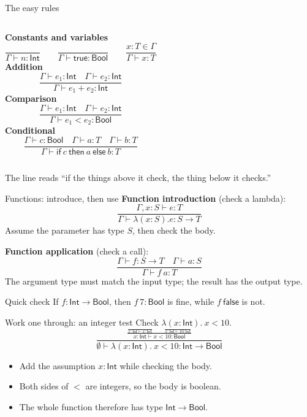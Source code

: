 \documentclass[aspectratio=169,11pt]{beamer}
\newcommand{\Bool}{\mathsf{Bool}}
\newcommand{\Int}{\mathsf{Int}}
\newcommand{\Arrow}{\mathbin{\to}}
\begin{document}
\begin{frame}{The easy rules}
\small
\begin{columns}[T]
\textbf{Constants and variables}
\[
\frac{}{\Gamma\vdash n:\Int}\qquad
\frac{}{\Gamma\vdash \mathsf{true}:\Bool}\qquad
\frac{x:T\in\Gamma}{\Gamma\vdash x:T}
\]
\textbf{Addition}
\[
\frac{\Gamma\vdash e_1:\Int\quad \Gamma\vdash e_2:\Int}
     {\Gamma\vdash e_1+e_2:\Int}
\]
\textbf{Comparison}
\[
\frac{\Gamma\vdash e_1:\Int\quad \Gamma\vdash e_2:\Int}
     {\Gamma\vdash e_1<e_2:\Bool}
\]
\textbf{Conditional}
\[
\frac{\Gamma\vdash c:\Bool\quad \Gamma\vdash a:T\quad \Gamma\vdash b:T}
     {\Gamma\vdash \mathsf{if}\ c\ \mathsf{then}\ a\ \mathsf{else}\ b:T}
\]
\end{columns}
\medskip
The line reads “if the things above it check, the thing below it checks.”
\end{frame}

\begin{frame}{Functions: introduce, then use}
\small
\textbf{Function introduction} (check a lambda):
\[
\frac{\Gamma,x:S\vdash e:T}
     {\Gamma\vdash \lambda(x:S).e:S\Arrow T}
\]
Assume the parameter has type $S$, then check the body.
\medskip

\textbf{Function application} (check a call):
\[
\frac{\Gamma\vdash f:S\Arrow T\quad \Gamma\vdash a:S}
     {\Gamma\vdash f\ a:T}
\]
The argument type must match the input type; the result has the output type.
\begin{exampleblock}{Quick check}
If $f:\Int\Arrow\Bool$, then $f\ 7:\Bool$ is fine, while $f\ \mathsf{false}$ is not.
\end{exampleblock}
\end{frame}

\begin{frame}{Work one through: an integer test}
Check $\lambda(x:\Int).\ x<10$.
\[
\frac{\displaystyle
  \frac{\displaystyle
    \frac{}{x:\Int\vdash x:\Int}\qquad
    \frac{}{x:\Int\vdash 10:\Int}}
  {x:\Int\vdash x<10:\Bool}}
{\emptyset\vdash \lambda(x:\Int).\ x<10:\Int\Arrow\Bool}
\]
\begin{itemize}
  \item Add the assumption $x:\Int$ while checking the body.
  \item Both sides of $<$ are integers, so the body is boolean.
  \item The whole function therefore has type $\Int\Arrow\Bool$.
\end{itemize}
\end{frame}
\end{document}
